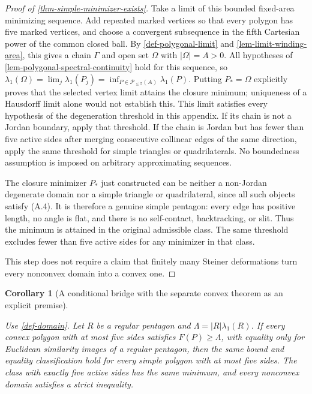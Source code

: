\documentclass[11pt,a4paper]{article}
\theoremstyle{proofmanuscript}
\newtheorem{corollary}[theorem]{Corollary}
\begin{document}
\begin{proof}[Proof of \ref{thm-simple-minimizer-exists}]
Take a limit of this bounded fixed-area minimizing sequence. Add repeated marked vertices so that every polygon has five marked vertices, and choose a convergent subsequence in the fifth Cartesian power of the common closed ball. By \ref{def-polygonal-limit} and \ref{lem-limit-winding-area}, this gives a chain \(\Gamma\) and open set \(\Omega\) with \(|\Omega|=A>0\). All hypotheses of \ref{lem-polygonal-spectral-continuity} hold for this sequence, so \(\lambda_1(\Omega)=\lim_j\lambda_1(P_j)=\inf_{P\in\mathscr P_{\le5}(A)}\lambda_1(P)\). Putting \(P_*=\Omega\) explicitly proves that the selected vertex limit attains the closure minimum; uniqueness of a Hausdorff limit alone would not establish this. This limit satisfies every hypothesis of the degeneration threshold in this appendix. If its chain is not a Jordan boundary, apply that threshold. If the chain is Jordan but has fewer than five active sides after merging consecutive collinear edges of the same direction, apply the same threshold for simple triangles or quadrilaterals. No boundedness assumption is imposed on arbitrary approximating sequences.

The closure minimizer \(P_*\) just constructed can be neither a non-Jordan degenerate domain nor a simple triangle or quadrilateral, since all such objects satisfy (A.4). It is therefore a genuine simple pentagon: every edge has positive length, no angle is flat, and there is no self-contact, backtracking, or slit. Thus the minimum is attained in the original admissible class. The same threshold excludes fewer than five active sides for any minimizer in that class.

This step does not require a claim that finitely many Steiner deformations turn every nonconvex domain into a convex one.

\end{proof}

\begin{corollary}[A conditional bridge with the separate convex theorem as an explicit premise]\label{cor-conditional-convex-bridge}

Use \ref{def-domain}. Let \(R\) be a regular pentagon and \(\Lambda=|R|\lambda_1(R)\). If every convex polygon with at most five sides satisfies \(F(P)\ge\Lambda\), with equality only for Euclidean similarity images of a regular pentagon, then the same bound and equality classification hold for every simple polygon with at most five sides. The class with exactly five active sides has the same minimum, and every nonconvex domain satisfies a strict inequality.

\end{corollary}
\end{document}
